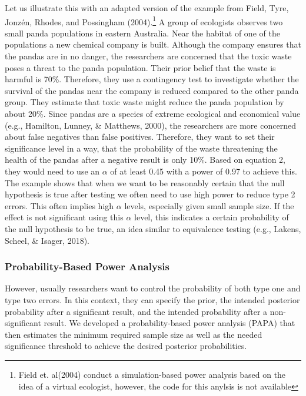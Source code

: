 \documentclass[
  english,
  ,jou,floatsintext]{apa6}
\begin{document}
Let us illustrate this with an adapted version of the example from Field, Tyre, Jonzén, Rhodes, and Possingham (2004).\footnote{Field et. al(2004) conduct a simulation-based power analysis based on the idea of a virtual ecologist, however, the code for this anylsis is not available} A group of ecologists observes two small panda populations in eastern Australia. Near the habitat of one of the populations a new chemical company is built. Although the company ensures that the pandas are in no danger, the researchers are concerned that the toxic waste poses a threat to the panda population. Their prior belief that the waste is harmful is 70\%. Therefore, they use a contingency test to investigate whether the survival of the pandas near the company is reduced compared to the other panda group. They estimate that toxic waste might reduce the panda population by about 20\%. Since pandas are a species of extreme ecological and economical value (e.g., Hamilton, Lunney, \& Matthews, 2000), the researchers are more concerned about false negatives than false positives. Therefore, they want to set their significance level in a way, that the probability of the waste threatening the health of the pandas after a negative result is only 10\%.
Based on equation 2, they would need to use an \(\alpha\) of at least 0.45 with a power of 0.97 to achieve this.
The example shows that when we want to be reasonably certain that the null hypothesis is true after testing we often need to use high power to reduce type 2 errors. This often implies high \(\alpha\) levels, especially given small sample size. If the effect is not significant using this \(\alpha\) level, this indicates a certain probability of the null hypothesis to be true, an idea similar to equivalence testing (e.g., Lakens, Scheel, \& Isager, 2018).

\hypertarget{probability-based-power-analysis}{%
\subsubsection{Probability-Based Power Analysis}\label{probability-based-power-analysis}}

However, usually researchers want to control the probability of both type one and type two errors. In this context, they can specify the prior, the intended posterior probability after a significant result, and the intended probability after a non-significant result. We developed a probability-based power analysis (PAPA) that then estimates the minimum required sample size as well as the needed significance threshold to achieve the desired posterior probabilities.
\end{document}
